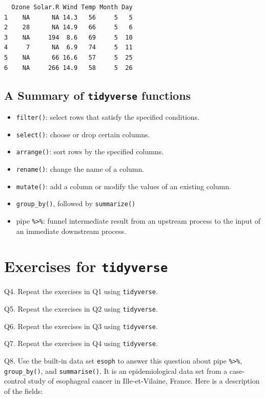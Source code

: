 \documentclass[
  letterpaper,
  DIV=11,
  numbers=noendperiod]{scrreprt}
\begin{document}
\begin{verbatim}
  Ozone Solar.R Wind Temp Month Day
1    NA      NA 14.3   56     5   5
2    28      NA 14.9   66     5   6
3    NA     194  8.6   69     5  10
4     7      NA  6.9   74     5  11
5    NA      66 16.6   57     5  25
6    NA     266 14.9   58     5  26
\end{verbatim}

\subsection{\texorpdfstring{A Summary of \texttt{tidyverse}
functions}{A Summary of tidyverse functions}}\label{a-summary-of-tidyverse-functions}

\begin{itemize}
\item
  \texttt{filter()}: select rows that satisfy the specified conditions.
\item
  \texttt{select()}: choose or drop certain columns.
\item
  \texttt{arrange()}: sort rows by the specified columns.
\item
  \texttt{rename()}: change the name of a column.
\item
  \texttt{mutate()}: add a column or modify the values of an existing
  column.
\item
  \texttt{group\_by()}, followed by \texttt{summarize()}
\item
  pipe \texttt{\%\textgreater{}\%}: funnel intermediate result from an
  upstream process to the input of an immediate downstream process.
\end{itemize}

\section{\texorpdfstring{Exercises for
\texttt{tidyverse}}{Exercises for tidyverse}}\label{exercises-for-tidyverse}

Q4. Repeat the exercises in Q1 using \texttt{tidyverse}.

Q5. Repeat the exercises in Q2 using \texttt{tidyverse}.

Q6. Repeat the exercises in Q3 using \texttt{tidyverse}.

Q7. Repeat the exercises in Q4 using \texttt{tidyverse}.

Q8. Use the built-in data set \texttt{esoph} to answer this question
about pipe \texttt{\%\textgreater{}\%}, \texttt{group\_by()}, and
\texttt{summarise()}. It is an epidemiological data set from a
case-control study of esophageal cancer in Ille-et-Vilaine, France. Here
is a description of the fields:
\end{document}
